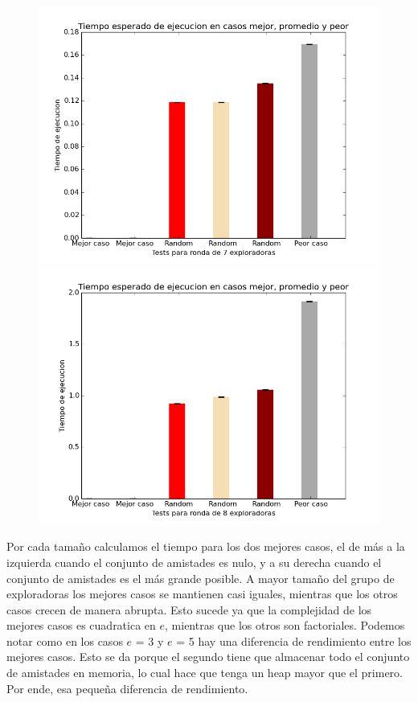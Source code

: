 \documentclass[spanish,a4paper]{article}
\begin{document}
      \begin{figure}[H]
        \includegraphics[scale=0.4]{tiemposE7}
        \includegraphics[scale=0.4]{tiemposE8}
      \end{figure}

Por cada tamaño calculamos el tiempo para los dos mejores casos, el de más a la izquierda cuando el conjunto de amistades es 
nulo, y a su derecha cuando el conjunto de amistades es el más grande posible. A mayor tamaño del grupo de exploradoras los mejores casos 
se mantienen casi iguales, mientras que los otros casos crecen de manera abrupta. Esto sucede ya que la complejidad de los mejores casos es 
cuadratica en $e$, mientras que los otros son factoriales. Podemos notar como en los casos $e$ = 3 y $e$ = 5 hay una diferencia de rendimiento entre los 
mejores casos. Esto se da porque el segundo tiene que almacenar todo el conjunto de amistades en memoria, lo cual hace que tenga un heap mayor 
que el primero. Por ende, esa pequeña diferencia de rendimiento.
\end{document}
